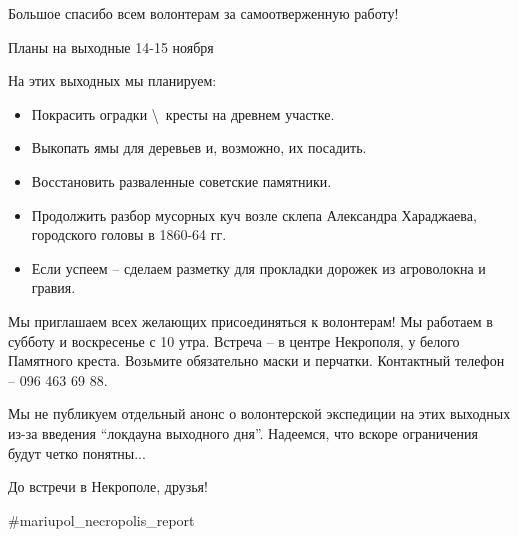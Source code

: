 Большое спасибо всем волонтерам за самоотверженную работу!

Планы на выходные 14-15 ноября

На этих выходных мы планируем:

\begin{itemize}
  \item Покрасить оградки \textbackslash\ кресты на древнем участке.
  \item Выкопать ямы для деревьев и, возможно, их посадить.
  \item Восстановить разваленные советские памятники.
  \item Продолжить разбор мусорных куч возле склепа Александра Хараджаева, городского головы в 1860-64 гг.
  \item Если успеем – сделаем разметку для прокладки дорожек из агроволокна и гравия.
\end{itemize}

Мы приглашаем всех желающих присоединяться к волонтерам! Мы работаем в субботу
и воскресенье с 10 утра. Встреча – в центре Некрополя, у белого Памятного
креста. Возьмите обязательно маски и перчатки. Контактный телефон – 096 463 69
88.

Мы не публикуем отдельный анонс о волонтерской экспедиции на этих выходных
из-за введения \enquote{локдауна выходного дня}. Надеемся, что вскоре ограничения будут
четко понятны...

До встречи в Некрополе, друзья!

\#mariupol\_necropolis\_report
